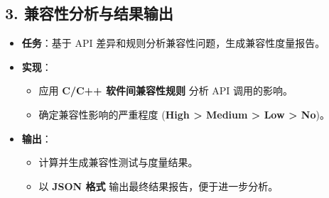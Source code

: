 \documentclass[14pt,a4paper,UTF8,twoside]{article}
\begin{document}
\begin{multicols}{3}
    \subsection*{3. 兼容性分析与结果输出}
    \begin{itemize}
        \item \textbf{任务}：基于 API 差异和规则分析兼容性问题，生成兼容性度量报告。
        \item \textbf{实现}：
        \begin{itemize}
            \item 应用 \textbf{C/C++ 软件间兼容性规则} 分析 API 调用的影响。
            \item 确定兼容性影响的严重程度 (\textbf{High > Medium > Low > No})。
        \end{itemize}
        \item \textbf{输出}：
        \begin{itemize}
            \item 计算并生成兼容性测试与度量结果。
            \item 以 \textbf{JSON 格式} 输出最终结果报告，便于进一步分析。
        \end{itemize}
    \end{itemize}

\end{multicols}
\end{document}
